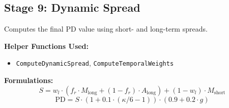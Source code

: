 \documentclass[11pt]{article}
\begin{document}
\subsection{Stage 9: Dynamic Spread}
Computes the final PD value using short- and long-term spreads.

\textbf{Helper Functions Used:}
\begin{itemize}
  \item \texttt{ComputeDynamicSpread}, \texttt{ComputeTemporalWeights}
\end{itemize}

\textbf{Formulations:}
\begin{equation}
S = w_l \cdot (f_r \cdot M_{\text{long}} + (1 - f_r) \cdot A_{\text{long}}) + (1 - w_l) \cdot M_{\text{short}}
\end{equation}
\begin{equation}
\text{PD} = S \cdot (1 + 0.1 \cdot (\kappa/6 - 1)) \cdot (0.9 + 0.2 \cdot g)
\end{equation}
\end{document}
